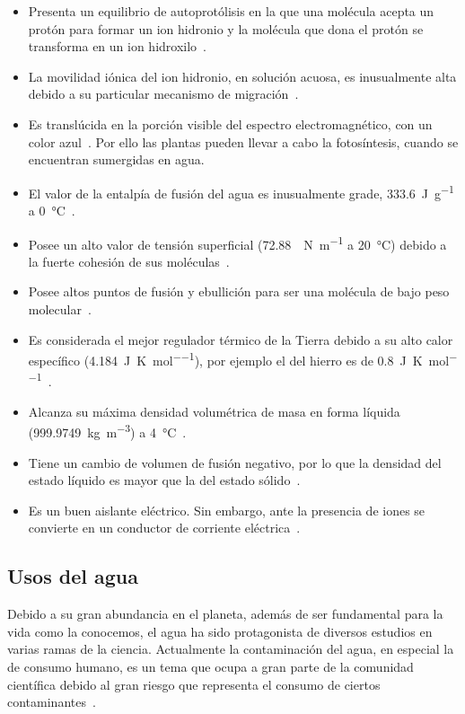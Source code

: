 \begin{itemize}

\item Presenta un equilibrio de autoprotólisis en la que una molécula acepta
un protón para formar un ion hidronio y la molécula que dona el protón se
transforma en un ion hidroxilo~\cite{mcmurry}.
\item La movilidad iónica del ion hidronio, en solución acuosa, es
inusualmente alta debido a su particular mecanismo de migración~\cite{voet}.
\pagebreak
\item Es translúcida en la porción visible del espectro
electromagnético, con un color azul~\cite{Braun1993}. Por ello
las plantas pueden llevar a cabo la
fotosíntesis, cuando se encuentran sumergidas en agua.
\item El valor de la entalpía de fusión del agua es inusualmente grade,
\SI{333.6}{\joule \per \gram} a \SI{0}{\celsius}~\cite{noauthororeditor2007handbook}.
\item Posee un alto valor de tensión superficial (\SI{72.88}{\milli
\newton \per \meter} a \SI{20}{\celsius}) debido a la fuerte cohesión de sus
moléculas~\cite{dean92:LHC}.
\item Posee altos puntos de fusión y ebullición para ser una molécula
de bajo peso molecular~\cite{morrison}.
\item Es considerada el mejor regulador térmico de la Tierra debido a su alto
calor específico (\SI{4.184}{\joule \per \kelvin \per \mole}), por ejemplo el del hierro es
de \SI{0.8}{\joule \per \kelvin \per \mole}~\cite{resnick}.
\item Alcanza su máxima densidad volumétrica de masa en forma líquida
(\SI{999.9749}{\kilo\gram\per\cubic\meter}) a \SI{4}{\celsius}~\cite{Tanaka_2001}.
\item Tiene un cambio de volumen de fusión negativo, por lo que la densidad
del estado líquido es mayor que la del estado sólido~\cite{serway2001fisica}.
\item Es un buen aislante eléctrico. Sin embargo, ante la presencia de iones
se convierte en un conductor de corriente eléctrica~\cite{chang}.
\end{itemize}

\subsection{Usos del agua}

Debido a su gran abundancia en el planeta, además de ser fundamental para la
vida como la conocemos, el agua ha sido protagonista de diversos estudios en
varias ramas de la ciencia. Actualmente la contaminación del agua, en especial
la de consumo humano, es un tema que ocupa a gran parte de la comunidad
científica debido al gran riesgo que representa el consumo de ciertos
contaminantes~\cite{Pandey2014, Bove1995}.

